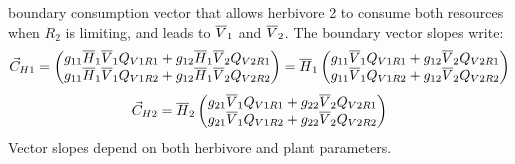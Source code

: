 \documentclass[12pt]{article}
\newcommand\barre[1]{\overline{\rule{0pt}{1.5ex}#1}}
\begin{document}
boundary consumption vector that allows herbivore 2 to consume both resources when $R_2$ is limiting, and leads to $\barre{V}_1$ and $\barre{V}_2$. %
The boundary vector slopes write:
\begin{equation}
\vec{C}_{H1}= 
\begin{pmatrix}
g_{11}\barre{H}_1\barre{V}_{1}Q_{V1R1}+g_{12}\barre{H}_1\barre{V}_{2}Q_{V2R1} \\
g_{11}\barre{H}_1\barre{V}_{1}Q_{V1R2}+g_{12}\barre{H}_1\barre{V}_{2}Q_{V2R2} \\
\end{pmatrix} 
=\barre{H}_1
\begin{pmatrix}
g_{11}\barre{V}_{1}Q_{V1R1}+g_{12}\barre{V}_{2}Q_{V2R1} \\
g_{11}\barre{V}_{1}Q_{V1R2}+g_{12}\barre{V}_{2}Q_{V2R2} \\
\end{pmatrix} 
\end{equation}
\begin{equation}
\vec{C}_{H2}= \barre{H}_2
\begin{pmatrix}
g_{21}\barre{V}_{1}Q_{V1R1}+g_{22}\barre{V}_{2}Q_{V2R1} \\
g_{21}\barre{V}_{1}Q_{V1R2}+g_{22}\barre{V}_{2}Q_{V2R2} \\
\end{pmatrix} 
\end{equation}
Vector slopes depend on both herbivore and plant parameters. 


\clearpage
\end{document}
